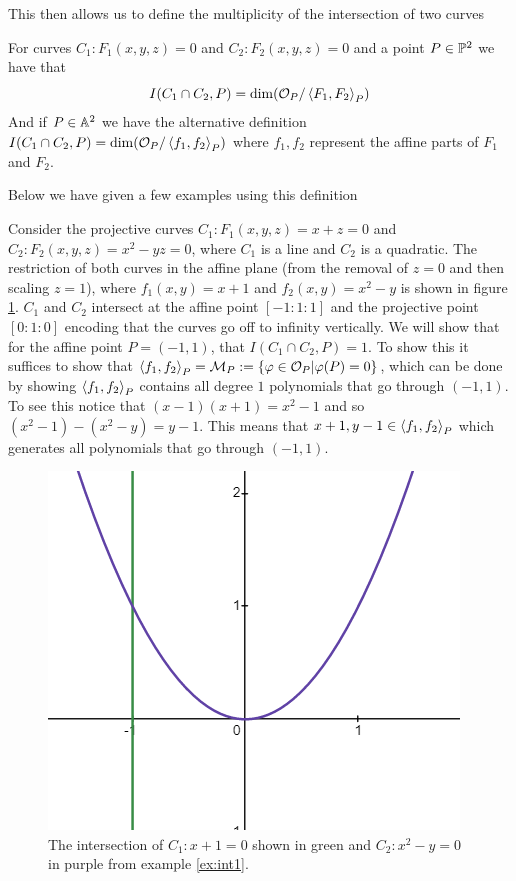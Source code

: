 This then allows us to define the multiplicity of the intersection of two curves
\begin{definition}
\label{def:intmult}
    For curves $C_1:F_1(x,y,z)=0$ and $C_2:F_2(x,y,z)=0$ and a point $P\in\P^2$ we have that 
    $$I(C_1\cap C_2,P)=\dim(\mathcal{O}_P/\ip{F_1,F_2}_P)$$
    And if $P\in \A^2$ we have the alternative definition $I(C_1\cap C_2,P)=\dim(\mathcal{O}_P/\ip{f_1,f_2}_P)$ where $f_1,f_2$ represent the affine parts of $F_1$ and $F_2$.
\end{definition}
Below we have given a few examples using this definition
\begin{example}
\label{ex:int1}
Consider the projective curves $C_1:F_1(x,y,z)=x+z=0$ and $C_2:F_2(x,y,z)=x^2-yz=0$, where $C_1$ is a line and $C_2$ is a quadratic. The restriction of both curves in the affine plane (from the removal of $z=0$ and then scaling $z=1$), where $f_1(x,y)=x+1$ and $f_2(x,y)=x^2-y$ is shown in figure \ref{fig:int1}. $C_1$ and $C_2$ intersect at the affine point $[-1:1:1]$ and the projective point $[0:1:0]$ encoding that the curves go off to infinity vertically. We will show that for the affine point $P=(-1,1)$, that $I(C_1\cap C_2,P)=1$. To show this it suffices to show that $\ip{f_1,f_2}_P=\mathcal{M}_P:=\{\phi\in \mathcal{O}_P| \phi(P)=0\}$, which can be done by showing $\ip{f_1,f_2}_P$ contains all degree $1$ polynomials that go through $(-1,1)$. To see this notice that $(x-1)(x+1)=x^2-1$ and so $(x^2-1)-(x^2-y)=y-1$. This means that $x+1,y-1\in\ip{f_1,f_2}_P$ which generates all polynomials that go through $(-1,1)$.
\begin{figure}
    \centering
    \includegraphics[scale=.5]{pics/graph2.png}
    \caption{The intersection of $C_1:x+1=0$ shown in green and $C_2:x^2-y=0$ in purple from example \ref{ex:int1}.}
    \label{fig:int1}
\end{figure}
\end{example}
